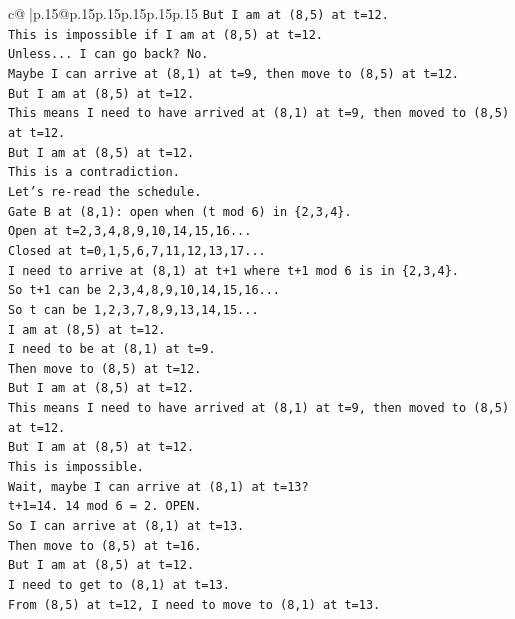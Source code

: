 \documentclass{article}
\begin{document}
{\begin{supertabular}{c@{$\;$}|p{.15\linewidth}@{}p{.15\linewidth}p{.15\linewidth}p{.15\linewidth}p{.15\linewidth}p{.15\linewidth}}
{{{\texttt{But I am at (8,5) at t=12.} \\
\texttt{This is impossible if I am at (8,5) at t=12.} \\
\texttt{Unless... I can go back? No.} \\
\texttt{Maybe I can arrive at (8,1) at t=9, then move to (8,5) at t=12.} \\
\texttt{But I am at (8,5) at t=12.} \\
\texttt{This means I need to have arrived at (8,1) at t=9, then moved to (8,5) at t=12.} \\
\texttt{But I am at (8,5) at t=12.} \\
\texttt{This is a contradiction.} \\
\texttt{Let's re{-}read the schedule.} \\
\texttt{Gate B at (8,1): open when (t mod 6) in \{2,3,4\}.} \\
\texttt{Open at t=2,3,4,8,9,10,14,15,16...} \\
\texttt{Closed at t=0,1,5,6,7,11,12,13,17...} \\
\texttt{I need to arrive at (8,1) at t+1 where t+1 mod 6 is in \{2,3,4\}.} \\
\texttt{So t+1 can be 2,3,4,8,9,10,14,15,16...} \\
\texttt{So t can be 1,2,3,7,8,9,13,14,15...} \\
\texttt{I am at (8,5) at t=12.} \\
\texttt{I need to be at (8,1) at t=9.} \\
\texttt{Then move to (8,5) at t=12.} \\
\texttt{But I am at (8,5) at t=12.} \\
\texttt{This means I need to have arrived at (8,1) at t=9, then moved to (8,5) at t=12.} \\
\texttt{But I am at (8,5) at t=12.} \\
\texttt{This is impossible.} \\
\texttt{Wait, maybe I can arrive at (8,1) at t=13?} \\
\texttt{t+1=14. 14 mod 6 = 2. OPEN.} \\
\texttt{So I can arrive at (8,1) at t=13.} \\
\texttt{Then move to (8,5) at t=16.} \\
\texttt{But I am at (8,5) at t=12.} \\
\texttt{I need to get to (8,1) at t=13.} \\
\texttt{From (8,5) at t=12, I need to move to (8,1) at t=13.} \\
}}}
\end{supertabular}}
\end{document}
